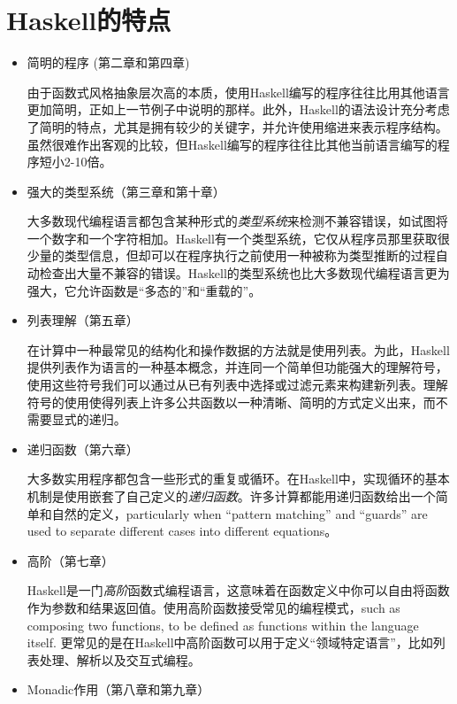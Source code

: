 \section{Haskell的特点}
\begin{itemize}
\item 简明的程序 (第二章和第四章)

由于函数式风格抽象层次高的本质，使用Haskell编写的程序往往比用其他语言更加简明，正如上一节例子中说明的那样。此外，Haskell的语法设计充分考虑了简明的特点，尤其是拥有较少的关键字，并允许使用缩进来表示程序结构。虽然很难作出客观的比较，但Haskell编写的程序往往比其他当前语言编写的程序短小2-10倍。\newline

\item 强大的类型系统（第三章和第十章）

大多数现代编程语言都包含某种形式的\textit{类型系统}来检测不兼容错误，如试图将一个数字和一个字符相加。Haskell有一个类型系统，它仅从程序员那里获取很少量的类型信息，但却可以在程序执行之前使用一种被称为类型推断的过程自动检查出大量不兼容的错误。Haskell的类型系统也比大多数现代编程语言更为强大，它允许函数是“多态的”和“重载的”。\newline

\item 列表理解（第五章）

在计算中一种最常见的结构化和操作数据的方法就是使用列表。为此，Haskell提供列表作为语言的一种基本概念，并连同一个简单但功能强大的理解符号，使用这些符号我们可以通过从已有列表中选择或过滤元素来构建新列表。理解符号的使用使得列表上许多公共函数以一种清晰、简明的方式定义出来，而不需要显式的递归。

\item 递归函数（第六章）

大多数实用程序都包含一些形式的重复或循环。在Haskell中，实现循环的基本机制是使用嵌套了自己定义的\textit{递归函数}。许多计算都能用递归函数给出一个简单和自然的定义，particularly when “pattern matching” and “guards” are used to separate different cases into different equations。

\item 高阶（第七章）

Haskell是一门\textit{高阶}函数式编程语言，这意味着在函数定义中你可以自由将函数作为参数和结果返回值。使用高阶函数接受常见的编程模式，such as composing two functions, to be defined as functions within the language itself.
更常见的是在Haskell中高阶函数可以用于定义“领域特定语言”，比如列表处理、解析以及交互式编程。

\item Monadic作用（第八章和第九章）


\end{itemize}
